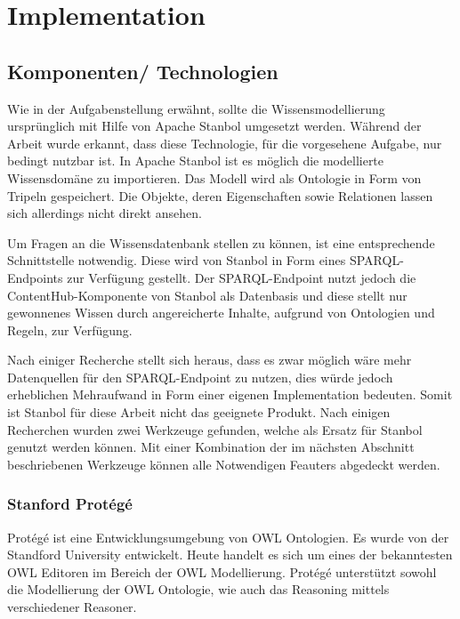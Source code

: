 \chapter{Implementation}
\label{chap:implementation}


\section{Komponenten/ Technologien}
\label{sec:komponenten}
Wie in der Aufgabenstellung erwähnt, sollte die Wissensmodellierung ursprünglich mit Hilfe von Apache Stanbol umgesetzt werden. Während der Arbeit wurde erkannt, dass diese Technologie, für die vorgesehene Aufgabe, nur bedingt nutzbar  ist. In Apache Stanbol ist es möglich die modellierte Wissensdomäne zu importieren. Das Modell wird als Ontologie in Form von Tripeln gespeichert. Die Objekte, deren Eigenschaften sowie Relationen lassen sich allerdings nicht direkt ansehen.

Um Fragen an die Wissensdatenbank stellen zu können, ist eine entsprechende Schnittstelle notwendig. Diese wird von Stanbol in Form eines SPARQL-Endpoints zur Verfügung gestellt. Der SPARQL-Endpoint nutzt jedoch die ContentHub-Komponente von Stanbol als Datenbasis und diese stellt nur gewonnenes Wissen durch angereicherte Inhalte, aufgrund von Ontologien und Regeln, zur Verfügung.

Nach einiger Recherche stellt sich heraus, dass es zwar möglich wäre mehr Datenquellen für den SPARQL-Endpoint zu nutzen, dies würde jedoch erheblichen Mehraufwand in Form einer eigenen Implementation bedeuten. Somit ist Stanbol für diese Arbeit nicht das geeignete Produkt. Nach einigen Recherchen wurden zwei Werkzeuge gefunden, welche als Ersatz für Stanbol genutzt werden können. Mit einer Kombination der im nächsten Abschnitt beschriebenen Werkzeuge können alle Notwendigen Feauters abgedeckt werden.


\subsection{Stanford Protégé}
\label{subsec:protege}

Protégé ist eine Entwicklungsumgebung von OWL Ontologien. Es wurde von der Standford University entwickelt. Heute handelt es sich um  eines der bekanntesten OWL Editoren im Bereich der OWL Modellierung.
Protégé unterstützt sowohl die Modellierung der OWL Ontologie, wie auch das Reasoning mittels verschiedener Reasoner.


